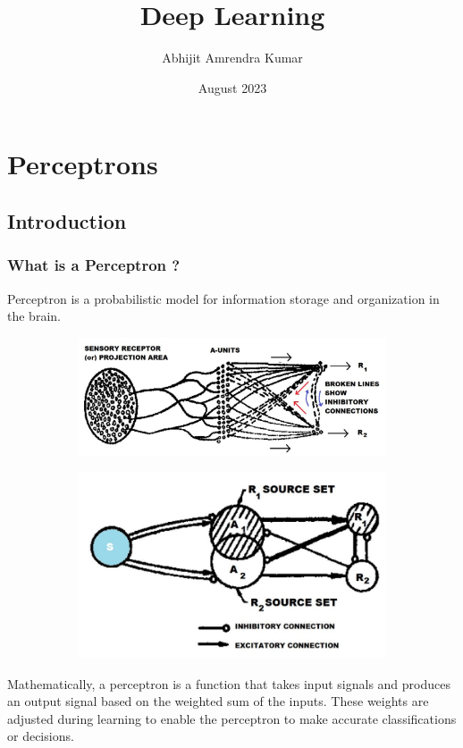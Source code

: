 \documentclass{report}
\title{Deep Learning}
\author{Abhijit Amrendra Kumar}
\date{August 2023}
\begin{document}
\maketitle

\chapter{Perceptrons}
\section{Introduction}
\subsection{What is a Perceptron ?}
\noindent Perceptron is a probabilistic model for information storage and organization in the brain.

\begin{figure}[H]
  \centering
  \begin{subfigure}{.5\linewidth}
    \centering
    \includegraphics[width=0.8\linewidth]{"images/perc-03.jpg"}
    \label{fig:sub1}
  \end{subfigure}%
  \begin{subfigure}{.5\linewidth}
    \centering
    \includegraphics[width=0.5\linewidth]{"images/perc-04.jpg"}
    \label{fig:sub2}
  \end{subfigure}
\end{figure}


\noindent Mathematically, a perceptron is a function that takes input signals and produces an output signal based on the weighted sum of the inputs. These weights are adjusted during learning to enable the perceptron to make accurate classifications or decisions. \\
\end{document}
